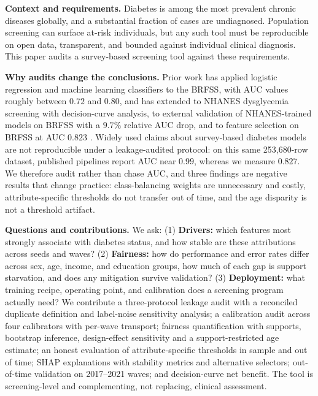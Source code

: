 \documentclass[conference]{IEEEtran}
\begin{document}
\textbf{Context and requirements.} Diabetes is among the most prevalent chronic diseases globally, and a substantial fraction of cases are undiagnosed. Population screening can surface at-risk individuals, but any such tool must be reproducible on open data, transparent, and bounded against individual clinical diagnosis. This paper audits a survey-based screening tool against these requirements.

\textbf{Why audits change the conclusions.} Prior work has applied logistic regression and machine learning classifiers to the BRFSS, with AUC values roughly between $0.72$ and $0.80$, and has extended to NHANES dysglycemia screening with decision-curve analysis, to external validation of NHANES-trained models on BRFSS with a $9.7\%$ relative AUC drop, and to feature selection on BRFSS at AUC $0.823$ \cite{xie2019,sun2026beyond,pall2026comprehensive,aich2026copula}. Widely used claims about survey-based diabetes models are not reproducible under a leakage-audited protocol: on this same 253{,}680-row dataset, published pipelines report AUC near $0.99$, whereas we measure $0.827$. We therefore audit rather than chase AUC, and three findings are negative results that change practice: class-balancing weights are unnecessary and costly, attribute-specific thresholds do not transfer out of time, and the age disparity is not a threshold artifact.

\textbf{Questions and contributions.} We ask: (1) \textbf{Drivers:} which features most strongly associate with diabetes status, and how stable are these attributions across seeds and waves? (2) \textbf{Fairness:} how do performance and error rates differ across sex, age, income, and education groups, how much of each gap is support starvation, and does any mitigation survive validation? (3) \textbf{Deployment:} what training recipe, operating point, and calibration does a screening program actually need? We contribute a three-protocol leakage audit with a reconciled duplicate definition and label-noise sensitivity analysis; a calibration audit across four calibrators with per-wave transport; fairness quantification with supports, bootstrap inference, design-effect sensitivity and a support-restricted age estimate; an honest evaluation of attribute-specific thresholds in sample and out of time; SHAP explanations with stability metrics and alternative selectors; out-of-time validation on 2017--2021 waves; and decision-curve net benefit. The tool is screening-level and complementing, not replacing, clinical assessment.
\end{document}
